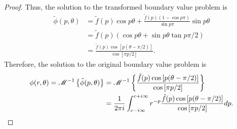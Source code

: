 \begin{proof}
  Thus, the solution to the transformed boundary value problem is
  \begin{align*}
    \tilde{\phi}(p, \theta)
    &= \tilde{f}(p) \cos p\theta + \frac{\tilde{f}(p)(1-\cos p \pi)}{\sin p \pi} \sin p\theta \\
    &=  \tilde{f}(p)\left(\cos p \theta + \sin p \theta \tan p \pi / 2\right)\\
    &= \frac{\tilde{f}(p) \cos\left[p(\theta - \pi / 2)\right]}{\cos\left[\pi p / 2\right]}.
  \end{align*}
  Therefore, the solution to the original boundary value problem is
  \begin{align*}
    \phi(r, \theta) = \mathscr{M}^{-1}\left\{ {\tilde{\phi}(p, \theta)} \right\}
    &= \mathscr{M}^{-1}\left\{ {\frac{\tilde{f}(p) \cos\left[p(\theta - \pi / 2)\right]}{\cos\left[\pi p / 2\right]}} \right\} \\
    &= \frac{1}{2\pi i}\int_{c-i\infty}^{c+i\infty} r^{-p} \frac{\tilde{f}(p) \cos\left[p(\theta - \pi / 2)\right]}{\cos\left[\pi p / 2\right]} dp.
  \end{align*}
\end{proof}
\newpage
